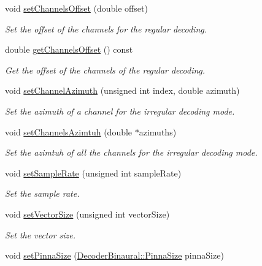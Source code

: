 \begin{DoxyCompactItemize}
void \hyperlink{class_hoa2_d_1_1_decoder_multi_a2cbf708c33f7bcb39895b058c1e139c1}{set\-Channels\-Offset} (double offset)
\begin{DoxyCompactList}\small\item\em Set the offset of the channels for the regular decoding. \end{DoxyCompactList}\item 
double \hyperlink{class_hoa2_d_1_1_decoder_multi_af31ea39af39be29e71f3b075470f16ad}{get\-Channels\-Offset} () const 
\begin{DoxyCompactList}\small\item\em Get the offset of the channels of the regular decoding. \end{DoxyCompactList}\item 
void \hyperlink{class_hoa2_d_1_1_decoder_multi_a3f8a24171531b8a83a21199d0c21608b}{set\-Channel\-Azimuth} (unsigned int index, double azimuth)
\begin{DoxyCompactList}\small\item\em Set the azimuth of a channel for the irregular decoding mode. \end{DoxyCompactList}\item 
void \hyperlink{class_hoa2_d_1_1_decoder_multi_ae87c004b9f042b301532e90a64f92414}{set\-Channels\-Azimtuh} (double $\ast$azimuths)
\begin{DoxyCompactList}\small\item\em Set the azimtuh of all the channels for the irregular decoding mode. \end{DoxyCompactList}\item 
void \hyperlink{class_hoa2_d_1_1_decoder_multi_aa15da12ba3889edc22ec9c148dd5c692}{set\-Sample\-Rate} (unsigned int sample\-Rate)
\begin{DoxyCompactList}\small\item\em Set the sample rate. \end{DoxyCompactList}\item 
void \hyperlink{class_hoa2_d_1_1_decoder_multi_a875eb671767c2f547453e6d7a1401f15}{set\-Vector\-Size} (unsigned int vector\-Size)
\begin{DoxyCompactList}\small\item\em Set the vector size. \end{DoxyCompactList}\item 
void \hyperlink{class_hoa2_d_1_1_decoder_multi_ace0ff4fdfda5661f27863d380e9e72c5}{set\-Pinna\-Size} (\hyperlink{class_hoa2_d_1_1_decoder_binaural_a29505dfc8fda1797dc2b059530f2383a}{Decoder\-Binaural\-::\-Pinna\-Size} pinna\-Size)

\end{DoxyCompactItemize}
